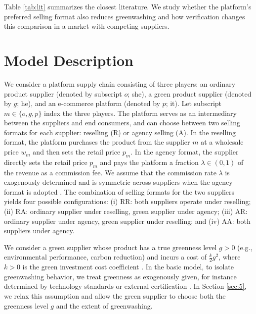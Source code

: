 \documentclass[preprint,review,12pt,authoryear,nopreprintline]{elsarticle}
\theoremstyle{definition}
\begin{document}
Table \ref{tab:lit} summarizes the closest literature. We study whether the platform's preferred selling format also reduces greenwashing and how verification changes this comparison in a market with competing suppliers.

\section{Model Description}\label{sec:3}

We consider a platform supply chain consisting of three players: an ordinary product supplier (denoted by subscript $o$; she), a green product supplier (denoted by $g$; he), and an e-commerce platform (denoted by $p$; it). Let subscript $m \in\{o, g, p\}$ index the three players. The platform serves as an intermediary between the suppliers and end consumers, and can choose between two selling formats for each supplier: reselling (R) or agency selling (A). In the reselling format, the platform purchases the product from the supplier $m$ at a wholesale price $w_m$ and then sets the retail price $p_m$. In the agency format, the supplier directly sets the retail price $p_m$ and pays the platform a fraction $\lambda \in (0,1)$ of the revenue as a commission fee. We assume that the commission rate $\lambda$ is exogenously determined and is symmetric across suppliers when the agency format is adopted \citep{li2024selling,yuan2025re}. The combination of selling formats for the two suppliers yields four possible configurations: (i) RR: both suppliers operate under reselling; (ii) RA: ordinary supplier under reselling, green supplier under agency; (iii) AR: ordinary supplier under agency, green supplier under reselling; and (iv) AA: both suppliers under agency.

We consider a green supplier whose product has a true greenness level $g > 0$ (e.g., environmental performance, carbon reduction) and incurs a cost of $\frac{k}{2}g^2$, where $k > 0$ is the green investment cost coefficient \citep{shen2022combat,xu2023coor}. In the basic model, to isolate greenwashing behavior, we treat greenness as exogenously given, for instance determined by technology standards or external certification \citep{xu2025should}. In Section \ref{sec:5}, we relax this assumption and allow the green supplier to choose both the greenness level $g$ and the extent of greenwashing.
\end{document}
